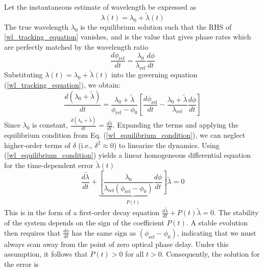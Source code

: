 \documentclass[12pt]{report}
\begin{document}
	Let the instantaneous estimate of wavelength be expressed as
	\begin{equation}
		\lambda(t) = \lambda_0 + \tilde{\lambda}(t)
	\end{equation}
	The true wavelength $\lambda_0$ is the equilibrium solution such that the RHS of \ref{wl_tracking_equation} vanishes, and is the value that gives phase rates which are perfectly matched by the wavelength ratio
	\begin{equation} \label{wl_equilibrium_condition}
		\frac{d\phi_\mathrm{ref}}{dt} = \frac{\lambda_0}{\lambda_\mathrm{ref}}\frac{d\phi}{dt}
	\end{equation}
	Substituting $\lambda(t) = \lambda_0 +  \tilde{\lambda}(t)$ into the governing equation (\ref{wl_tracking_equation}), we obtain:
	\begin{equation}
		\frac{d(\lambda_0 + \tilde{\lambda})}{dt} = \frac{\lambda_0 + \tilde{\lambda}}{\phi_\mathrm{ref} - \phi_0} \left[ \frac{d\phi_\mathrm{ref}}{dt} - \frac{\lambda_0 + \tilde{\lambda}}{\lambda_\mathrm{ref}}\frac{d\phi}{dt} \right]
	\end{equation}
	Since $\lambda_0$ is constant, $\frac{d(\lambda_0 + \tilde{\lambda})}{dt} = \frac{d\tilde{\lambda}}{dt}$. Expanding the terms and applying the equilibrium condition from Eq. (\ref{wl_equilibrium_condition}), we can neglect higher-order terms of $\delta$ (i.e., $\delta^2 \approx 0$) to linearize the dynamics.
	Using (\ref{wl_equilibrium_condition}) yields a linear homogeneous differential equation for the time-dependent error $ \tilde{\lambda}(t)$
	\begin{equation}
		\frac{d\tilde{\lambda}}{dt} + \underbrace{\left[ \frac{\lambda_0}{\lambda_\mathrm{ref}(\phi_\mathrm{ref} - \phi_0)} \frac{d\phi}{dt} \right]}_{\begin{matrix}P(t)\end{matrix}} \tilde{\lambda} = 0
	\end{equation}
	This is in the form of a first-order decay equation $\frac{d\tilde{\lambda}}{dt} + P(t)\tilde{\lambda} = 0$. The stability of the system depends on the sign of the coefficient $P(t)$. A stable evolution then requires that $\frac{d\phi}{dt}$ has the same sign as $(\phi_\mathrm{ref} - \phi_0)$, indicating that we must always scan away from the point of zero optical phase delay. Under this assumption, it follows that $P(t) > 0$ for all $t > 0$. Consequently, the solution for the error is
\end{document}
